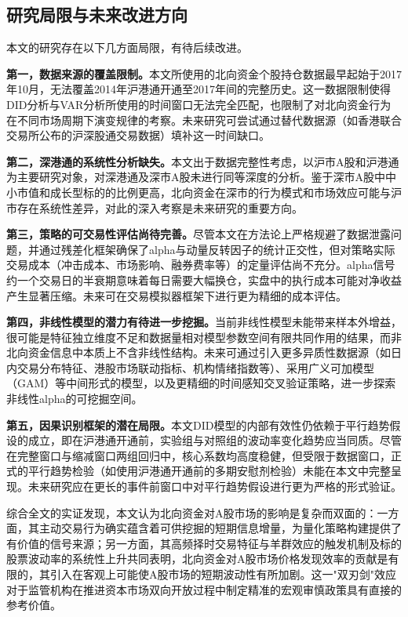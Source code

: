 \documentclass{article}
\begin{document}
\subsection*{研究局限与未来改进方向}

本文的研究存在以下几方面局限，有待后续改进。

\textbf{第一，数据来源的覆盖限制。}本文所使用的北向资金个股持仓数据最早起始于2017年10月，无法覆盖2014年沪港通开通至2017年间的完整历史。这一数据限制使得DID分析与VAR分析所使用的时间窗口无法完全匹配，也限制了对北向资金行为在不同市场周期下演变规律的考察。未来研究可尝试通过替代数据源（如香港联合交易所公布的沪深股通交易数据）填补这一时间缺口。

\textbf{第二，深港通的系统性分析缺失。}本文出于数据完整性考虑，以沪市A股和沪港通为主要研究对象，对深港通及深市A股未进行同等深度的分析。鉴于深市A股中中小市值和成长型标的的比例更高，北向资金在深市的行为模式和市场效应可能与沪市存在系统性差异，对此的深入考察是未来研究的重要方向。

\textbf{第三，策略的可交易性评估尚待完善。}尽管本文在方法论上严格规避了数据泄露问题，并通过残差化框架确保了alpha与动量反转因子的统计正交性，但对策略实际交易成本（冲击成本、市场影响、融券费率等）的定量评估尚不充分。alpha信号约一个交易日的半衰期意味着每日需要大幅换仓，实盘中的执行成本可能对净收益产生显著压缩。未来可在交易模拟器框架下进行更为精细的成本评估。

\textbf{第四，非线性模型的潜力有待进一步挖掘。}当前非线性模型未能带来样本外增益，很可能是特征独立维度不足和数据量相对模型参数空间有限共同作用的结果，而非北向资金信息中本质上不含非线性结构。未来可通过引入更多异质性数据源（如日内交易分布特征、港股市场联动指标、机构情绪指数等）、采用广义可加模型（GAM）等中间形式的模型，以及更精细的时间感知交叉验证策略，进一步探索非线性alpha的可挖掘空间。

\textbf{第五，因果识别框架的潜在局限。}本文DID模型的内部有效性仍依赖于平行趋势假设的成立，即在沪港通开通前，实验组与对照组的波动率变化趋势应当同质。尽管在完整窗口与缩减窗口两组回归中，核心系数均高度稳健，但受限于数据窗口，正式的平行趋势检验（如使用沪港通开通前的多期安慰剂检验）未能在本文中完整呈现。未来研究应在更长的事件前窗口中对平行趋势假设进行更为严格的形式验证。

综合全文的实证发现，本文认为北向资金对A股市场的影响是复杂而双面的：一方面，其主动交易行为确实蕴含着可供挖掘的短期信息增量，为量化策略构建提供了有价值的信号来源；另一方面，其高频择时交易特征与羊群效应的触发机制及标的股票波动率的系统性上升共同表明，北向资金对A股市场价格发现效率的贡献是有限的，其引入在客观上可能使A股市场的短期波动性有所加剧。这一"双刃剑"效应对于监管机构在推进资本市场双向开放过程中制定精准的宏观审慎政策具有直接的参考价值。

\newpage
\nocite{*}
\printbibliography
\end{document}
